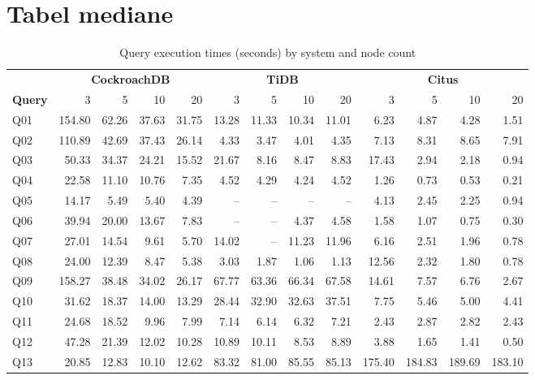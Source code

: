 
\chapter{Tabel mediane}

    \begin{table}[H]
\centering
\caption{Query execution times (seconds) by system and node count}
\setlength{\tabcolsep}{3.2pt}
\renewcommand{\arraystretch}{1.15}
\footnotesize
\begin{tabular}{l*{12}{r}}
\toprule
& \multicolumn{4}{c}{\textbf{CockroachDB}} & \multicolumn{4}{c}{\textbf{TiDB}} & \multicolumn{4}{c}{\textbf{Citus}} \\
\cmidrule(lr){2-5}\cmidrule(lr){6-9}\cmidrule(lr){10-13}
\textbf{Query} & 3 & 5 & 10 & 20 & 3 & 5 & 10 & 20 & 3 & 5 & 10 & 20 \\
\midrule
Q01 & 154.80 & 62.26 & 37.63 & 31.75 & 13.28 & 11.33 & 10.34 & 11.01 & 6.23 & 4.87 & 4.28 & 1.51 \\
Q02 & 110.89 & 42.69 & 37.43 & 26.14 & 4.33 & 3.47 & 4.01 & 4.35 & 7.13 & 8.31 & 8.65 & 7.91 \\
Q03 & 50.33 & 34.37 & 24.21 & 15.52 & 21.67 & 8.16 & 8.47 & 8.83 & 17.43 & 2.94 & 2.18 & 0.94 \\
Q04 & 22.58 & 11.10 & 10.76 & 7.35 & 4.52 & 4.29 & 4.24 & 4.52 & 1.26 & 0.73 & 0.53 & 0.21 \\
Q05 & 14.17 & 5.49 & 5.40 & 4.39 & -- & -- & -- & -- & 4.13 & 2.45 & 2.25 & 0.94 \\
Q06 & 39.94 & 20.00 & 13.67 & 7.83 & -- & -- & 4.37 & 4.58 & 1.58 & 1.07 & 0.75 & 0.30 \\
Q07 & 27.01 & 14.54 & 9.61 & 5.70 & 14.02 & -- & 11.23 & 11.96 & 6.16 & 2.51 & 1.96 & 0.78 \\
Q08 & 24.00 & 12.39 & 8.47 & 5.38 & 3.03 & 1.87 & 1.06 & 1.13 & 12.56 & 2.32 & 1.80 & 0.78 \\
Q09 & 158.27 & 38.48 & 34.02 & 26.17 & 67.77 & 63.36 & 66.34 & 67.58 & 14.61 & 7.57 & 6.76 & 2.67 \\
Q10 & 31.62 & 18.37 & 14.00 & 13.29 & 28.44 & 32.90 & 32.63 & 37.51 & 7.75 & 5.46 & 5.00 & 4.41 \\
Q11 & 24.68 & 18.52 & 9.96 & 7.99 & 7.14 & 6.14 & 6.32 & 7.21 & 2.43 & 2.87 & 2.82 & 2.43 \\
Q12 & 47.28 & 21.39 & 12.02 & 10.28 & 10.89 & 10.11 & 8.53 & 8.89 & 3.88 & 1.65 & 1.41 & 0.50 \\
Q13 & 20.85 & 12.83 & 10.10 & 12.62 & 83.32 & 81.00 & 85.55 & 85.13 & 175.40 & 184.83 & 189.69 & 183.10 \\

\end{tabular}
\end{table}
